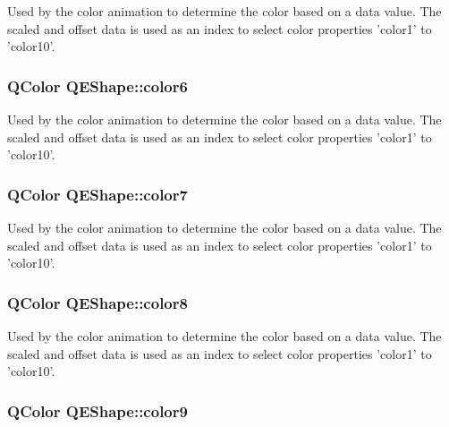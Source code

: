 \label{classQEShape_ad8a11f05889b2a64719a4e74e29a2714}
Used by the color animation to determine the color based on a data value. The scaled and offset data is used as an index to select color properties 'color1' to 'color10'. \hypertarget{classQEShape_af08cdd85e181933be792886e7c6e9bc5}{
\subsubsection[{color6}]{\setlength{\rightskip}{0pt plus 5cm}QColor QEShape::color6}}
\label{classQEShape_af08cdd85e181933be792886e7c6e9bc5}
Used by the color animation to determine the color based on a data value. The scaled and offset data is used as an index to select color properties 'color1' to 'color10'. \hypertarget{classQEShape_a3b77f142d12dfeb5267d0b214f135f34}{
\subsubsection[{color7}]{\setlength{\rightskip}{0pt plus 5cm}QColor QEShape::color7}}
\label{classQEShape_a3b77f142d12dfeb5267d0b214f135f34}
Used by the color animation to determine the color based on a data value. The scaled and offset data is used as an index to select color properties 'color1' to 'color10'. \hypertarget{classQEShape_ad127eb638763dfa278dbe35d21bcc3f4}{
\subsubsection[{color8}]{\setlength{\rightskip}{0pt plus 5cm}QColor QEShape::color8}}
\label{classQEShape_ad127eb638763dfa278dbe35d21bcc3f4}
Used by the color animation to determine the color based on a data value. The scaled and offset data is used as an index to select color properties 'color1' to 'color10'. \hypertarget{classQEShape_ab12e5d604756ac4fa449f3569cc379f5}{
\subsubsection[{color9}]{\setlength{\rightskip}{0pt plus 5cm}QColor QEShape::color9}}
